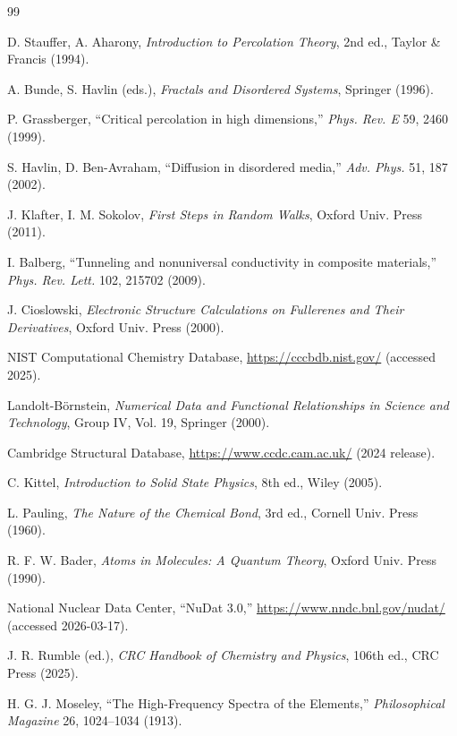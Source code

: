 \documentclass[12pt,a4paper]{article}
\theoremstyle{remark}
\begin{document}
	\begin{thebibliography}{99}
		
		
		D. Stauffer, A. Aharony, \emph{Introduction to Percolation Theory}, 2nd ed., Taylor \& Francis (1994).
		
		A. Bunde, S. Havlin (eds.), \emph{Fractals and Disordered Systems}, Springer (1996).
		
		P. Grassberger, ``Critical percolation in high dimensions,'' \emph{Phys. Rev. E} 59, 2460 (1999).
		
		S. Havlin, D. Ben-Avraham, ``Diffusion in disordered media,'' \emph{Adv. Phys.} 51, 187 (2002).
		
		J. Klafter, I. M. Sokolov, \emph{First Steps in Random Walks}, Oxford Univ. Press (2011).
		
		I. Balberg, ``Tunneling and nonuniversal conductivity in composite materials,'' \emph{Phys. Rev. Lett.} 102, 215702 (2009).
		
		J. Cioslowski, \emph{Electronic Structure Calculations on Fullerenes and Their Derivatives}, Oxford Univ. Press (2000).
		
		NIST Computational Chemistry Database, \url{https://cccbdb.nist.gov/} (accessed 2025).
		
		Landolt-Börnstein, \emph{Numerical Data and Functional Relationships in Science and Technology}, Group IV, Vol. 19, Springer (2000).
		
		Cambridge Structural Database, \url{https://www.ccdc.cam.ac.uk/} (2024 release).
		
		C. Kittel, \emph{Introduction to Solid State Physics}, 8th ed., Wiley (2005).
		
		L. Pauling, \emph{The Nature of the Chemical Bond}, 3rd ed., Cornell Univ. Press (1960).
		
		R. F. W. Bader, \emph{Atoms in Molecules: A Quantum Theory}, Oxford Univ. Press (1990).
		
		National Nuclear Data Center, ``NuDat 3.0,'' \url{https://www.nndc.bnl.gov/nudat/} (accessed 2026-03-17).
		
		J. R. Rumble (ed.), \emph{CRC Handbook of Chemistry and Physics}, 106th ed., CRC Press (2025).
		
		H. G. J. Moseley, ``The High-Frequency Spectra of the Elements,'' \emph{Philosophical Magazine} 26, 1024--1034 (1913).
	\end{thebibliography}
	
\end{document}
